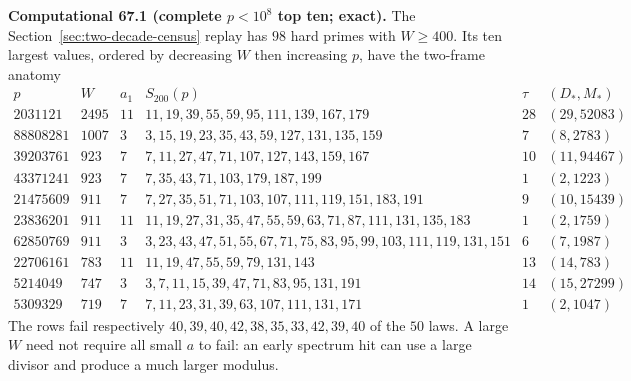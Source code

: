 \documentclass[10pt,reqno]{amsart}
\theoremstyle{definition}
\newcommand{\1}{\mathbf 1}
\begin{document}
\medskip\noindent\textbf{Computational 67.1 (complete $p<10^8$ top ten;
exact).}
The Section~\ref{sec:two-decade-census} replay has $98$ hard primes with
$W\geq400$.  Its ten largest values, ordered by decreasing $W$ then
increasing $p$, have the two-frame anatomy
\begingroup\scriptsize
\begin{equation}\tag{67.3}
\begin{array}{r|r|r|l|r|r}
p&W&a_1&S_{200}(p)&\tau&(D_*,M_*)\\ \hline
2031121&2495&11&11,19,39,55,59,95,111,139,167,179&28&(29,52083)\\
88808281&1007&3&3,15,19,23,35,43,59,127,131,135,159&7&(8,2783)\\
39203761&923&7&7,11,27,47,71,107,127,143,159,167&10&(11,94467)\\
43371241&923&7&7,35,43,71,103,179,187,199&1&(2,1223)\\
21475609&911&7&7,27,35,51,71,103,107,111,119,151,183,191&9&(10,15439)\\
23836201&911&11&11,19,27,31,35,47,55,59,63,71,87,111,131,135,183&1&(2,1759)\\
62850769&911&3&3,23,43,47,51,55,67,71,75,83,95,99,103,111,119,131,151&6&(7,1987)\\
22706161&783&11&11,19,47,55,59,79,131,143&13&(14,783)\\
5214049&747&3&3,7,11,15,39,47,71,83,95,131,191&14&(15,27299)\\
5309329&719&7&7,11,23,31,39,63,107,111,131,171&1&(2,1047)
\end{array}
\end{equation}
\endgroup
The rows fail respectively $40,39,40,42,38,35,33,42,39,40$ of the $50$
laws.  A large $W$ need not require all small $a$ to fail: an early spectrum
hit can use a large divisor and produce a much larger modulus.
\end{document}
